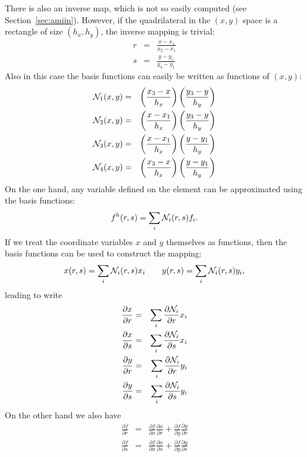 There is also an inverse map, which is not so easily computed (see Section~\ref{sec:amiin}).
However, if the quadrilateral in the $(x,y)$ space is a rectangle of size $(h_x,h_y)$, 
the inverse mapping is trivial:
\begin{eqnarray}
r&=&\frac{x-x_1}{x_2-x_1} \\
s&=&\frac{y-y_1}{y_4-y_1} 
\end{eqnarray}
Also in this case the basis functions can easily be written as functions of $(x,y)$:
\begin{eqnarray}
{\mathcal{N}}_1(x,y) &=& \left( \frac{x_3 -x }{h_x}  \right) \left( \frac{y_3 -y }{h_y}  \right) \nonumber\\
{\mathcal{N}}_2(x,y) &=& \left( \frac{x - x_1}{h_x}  \right) \left( \frac{y_3 -y }{h_y}  \right) \nonumber\\
{\mathcal{N}}_3(x,y) &=& \left( \frac{x - x_1}{h_x}  \right) \left( \frac{y - y_1}{h_y}  \right) \nonumber\\
{\mathcal{N}}_4(x,y) &=& \left( \frac{x_3 -x }{h_x}  \right) \left( \frac{y - y_1}{h_y}  \right) \nonumber 
\end{eqnarray}
On the one hand, any variable defined on the element can be approximated using the basis functions:
\begin{equation}
f^h(r,s)=\sum_i {\mathcal{N}}_i(r,s) f_i.
\end{equation}
If we treat the coordinate variables $x$ and $y$ themselves as functions, 
then the basis functions can be used to construct the mapping:
\begin{equation}
x(r,s)=\sum_i {\mathcal{N}}_i(r,s) x_i 
\qquad
y(r,s)=\sum_i {\mathcal{N}}_i(r,s) y_i,  \label{eqxy}
\end{equation}
leading to write
\begin{eqnarray}
\frac{\partial x}{\partial r} &=& \sum_i \frac{\partial {\mathcal{N}}_i}{\partial r} x_i \\
\frac{\partial x}{\partial s} &=& \sum_i \frac{\partial {\mathcal{N}}_i}{\partial s} x_i \\
\frac{\partial y}{\partial r} &=& \sum_i \frac{\partial {\mathcal{N}}_i}{\partial r} y_i \\
\frac{\partial y}{\partial s} &=& \sum_i \frac{\partial {\mathcal{N}}_i}{\partial s} y_i 
\end{eqnarray}
On the other hand we also have 
\begin{eqnarray}
\frac{\partial f}{\partial r} &=&
\frac{\partial f}{\partial x}\frac{\partial x}{\partial r}
+\frac{\partial f}{\partial y}\frac{\partial y}{\partial r} \\
\frac{\partial f}{\partial s} &=&
\frac{\partial f}{\partial x}\frac{\partial x}{\partial s}
+\frac{\partial f}{\partial y}\frac{\partial y}{\partial s}
\end{eqnarray}
